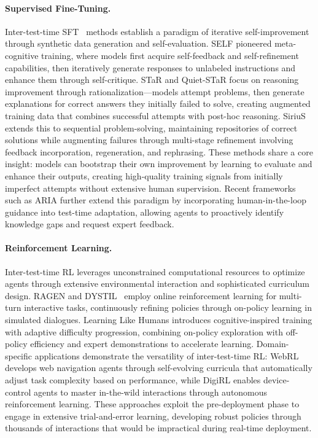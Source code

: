 \paragraph{Supervised Fine-Tuning.} Inter-test-time SFT~\citep{chen2025sft} methods establish a paradigm of iterative self-improvement through synthetic data generation and self-evaluation. SELF \citep{lu2023self} pioneered meta-cognitive training, where models first acquire self-feedback and self-refinement capabilities, then iteratively generate responses to unlabeled instructions and enhance them through self-critique. STaR \citep{zelikman2022star} and Quiet-STaR \citep{zelikman2024quiet} focus on reasoning improvement through rationalization—models attempt problems, then generate explanations for correct answers they initially failed to solve, creating augmented training data that combines successful attempts with post-hoc reasoning. SiriuS \citep{zhao2025sirius} extends this to sequential problem-solving, maintaining repositories of correct solutions while augmenting failures through multi-stage refinement involving feedback incorporation, regeneration, and rephrasing. These methods share a core insight: models can bootstrap their own improvement by learning to evaluate and enhance their outputs, creating high-quality training signals from initially imperfect attempts without extensive human supervision. Recent frameworks such as ARIA \citep{he-etal-2025-enabling} further extend this paradigm by incorporating human-in-the-loop guidance into test-time adaptation, allowing agents to proactively identify knowledge gaps and request expert feedback.


\paragraph{Reinforcement Learning.} Inter-test-time RL leverages unconstrained computational resources to optimize agents through extensive environmental interaction and sophisticated curriculum design. RAGEN \citep{wang2025ragen} and DYSTIL~\citep{wang2025dystildynamicstrategyinduction}  employ online reinforcement learning for multi-turn interactive tasks, continuously refining policies through on-policy learning in simulated dialogues. Learning Like Humans \citep{zhang2025learning} introduces cognitive-inspired training with adaptive difficulty progression, combining on-policy exploration with off-policy efficiency and expert demonstrations to accelerate learning. Domain-specific applications demonstrate the versatility of inter-test-time RL: WebRL \citep{qi2024webrl} develops web navigation agents through self-evolving curricula that automatically adjust task complexity based on performance, while DigiRL \citep{bai2024digirl} enables device-control agents to master in-the-wild interactions through autonomous reinforcement learning. 
These approaches exploit the pre-deployment phase to engage in extensive trial-and-error learning, developing robust policies through thousands of interactions that would be impractical during real-time deployment.
